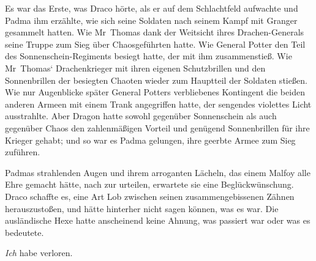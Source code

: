 Es war das Erste, was Draco hörte, als er auf dem Schlachtfeld aufwachte und Padma ihm erzählte, wie sich seine Soldaten nach seinem Kampf mit Granger gesammelt hatten. Wie Mr~Thomas dank der Weitsicht ihres Drachen-Generals seine Truppe zum Sieg über Chaosgeführten hatte.
Wie General Potter den Teil des Sonnenschein-Regiments besiegt hatte, der mit ihm zusammenstieß. Wie Mr~Thomas‘ Drachenkrieger mit ihren eigenen Schutzbrillen und den Sonnenbrillen der besiegten Chaoten wieder zum Hauptteil der Soldaten stießen. Wie nur Augenblicke später General Potters verbliebenes Kontingent die beiden anderen Armeen mit einem Trank angegriffen hatte, der sengendes violettes Licht ausstrahlte. Aber Dragon hatte sowohl gegenüber Sonnenschein als auch gegenüber Chaos den zahlenmäßigen Vorteil und genügend Sonnenbrillen für ihre Krieger gehabt; und so war es Padma gelungen, ihre geerbte Armee zum Sieg zuführen.

Padmas strahlenden Augen und ihrem arroganten Lächeln, das einem Malfoy alle Ehre gemacht hätte, nach zur urteilen, erwartete sie eine Beglückwünschung. Draco schaffte es, eine Art Lob zwischen seinen zusammengebissenen Zähnen herauszustoßen, und hätte hinterher nicht sagen können, was es war. Die ausländische Hexe hatte anscheinend keine Ahnung, was passiert war oder was es bedeutete.

\emph{Ich} habe verloren.

